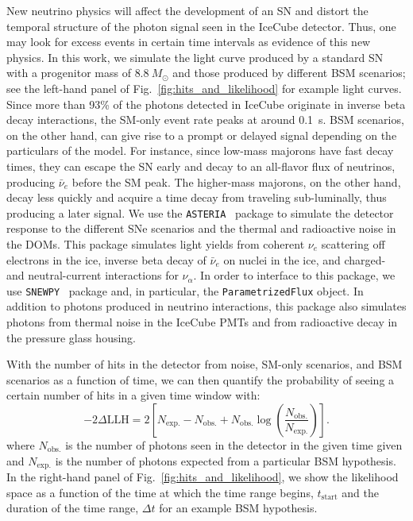 New neutrino physics will affect the development of an SN and distort the temporal structure of the photon signal seen in the IceCube detector.
Thus, one may look for excess events in certain time intervals as evidence of this new physics.
In this work, we simulate the light curve produced by a standard SN with a progenitor mass of $8.8~M_{\odot}$ and those produced by different BSM scenarios; see the left-hand panel of Fig.~\ref{fig:hits_and_likelihood} for example light curves.
Since more than 93\% of the photons detected in IceCube originate in inverse beta decay interactions, the SM-only event rate peaks at around 0.1~s.
BSM scenarios, on the other hand, can give rise to a prompt or delayed signal depending on the particulars of the model.
For instance, since low-mass majorons have fast decay times, they can escape the SN early and decay to an all-flavor flux of neutrinos, producing $\bar{\nu}_{e}$ before the SM peak.
The higher-mass majorons, on the other hand, decay less quickly and acquire a time decay from traveling sub-luminally, thus producing a later signal.
We use the \texttt{ASTERIA}~\cite{spencer_griswold_2020_3926835} package to simulate the detector response to the different SNe scenarios and the thermal and radioactive noise in the DOMs.
This package simulates light yields from coherent $\nu_{e}$ scattering off electrons in the ice, inverse beta decay of $\bar{\nu}_{e}$ on nuclei in the ice, and charged- and neutral-current interactions for $\nu_{\alpha}$.
In order to interface to this package, we use \texttt{SNEWPY}~\cite{baxter2021snewpy} package and, in particular, the \texttt{ParametrizedFlux} object.
In addition to photons produced in neutrino interactions, this package also simulates photons from thermal noise in the IceCube PMTs and from radioactive decay in the pressure glass housing.

With the number of hits in the detector from noise, SM-only scenarios, and BSM scenarios as a function of time, we can then quantify the probability of seeing a certain number of hits in a given time window with:
\begin{equation}
    -2\Delta\mathrm{LLH} = 2 \left[N_{\mathrm{exp.}} - N_{\mathrm{obs.}} + N_{\mathrm{obs.}}\log\left(\frac{N_{\mathrm{obs.}}}{N_{\mathrm{exp.}}}\right)\right].
\end{equation}
where $N_{\mathrm{obs.}}$ is the number of photons seen in the detector in the given time given and $N_{\mathrm{exp.}}$ is the number of photons expected from a particular BSM hypothesis.
In the right-hand panel of Fig.~\ref{fig:hits_and_likelihood}, we show the likelihood space as a function of the time at which the time range begins, $t_{\mathrm{start}}$ and the duration of the time range, $\Delta t$ for an example BSM hypothesis.

